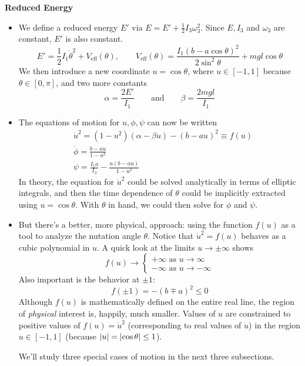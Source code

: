 \documentclass[11pt, a4paper]{article}
\newcommand{\eqtext}[1]{\qquad \text{#1} \qquad}
\newcommand{\veff}{V_{\text{eff}}}
\begin{document}
\textbf{Reduced Energy}
\begin{itemize}
	\item  We define a reduced energy $ E' $ via $ E = E' + \frac{1}{2}I_3 \omega_3^2 $. Since $ E, I_3 $ and $ \omega_3 $ are constant, $ E' $ is also constant.
	\begin{equation*}
		E' = \frac{1}{2}I_1 \dot{\theta}^2 + \veff(\theta), \qquad \veff(\theta) = \frac{I_1(b-a\cos \theta)^2}{2\sin^2 \theta} + mgl\cos \theta
	\end{equation*}
	We then introduce a new coordinate $ u = \cos \theta $, where $ u \in [-1, 1] $ because $ \theta \in [0, \pi] $, and two more constants
	\begin{equation*}
		\alpha = \frac{2 E'}{I_1} \eqtext{and} \beta = \frac{2mgl}{I_1}
	\end{equation*}
	
	\item The equations of motion for $ u, \phi, \psi $ can now be written
	\begin{align*}
		& \dot{u}^2  = (1-u^{2})(\alpha - \beta u) - (b - a u)^2 \equiv f(u)\\
		&\dot{\phi} = \frac{b-au}{1-u^2}\\
		&\dot{\psi} = \frac{I_1a}{I_3} - \frac{u(b-au)}{1-u^2}
	\end{align*}
	In theory, the equation for $ \dot{u}^{2} $ could be solved analytically in terms of elliptic integrals, and then the time dependence of $ \theta $ could be implicitly extracted using $ u = \cos \theta $. With $ \theta $ in hand, we could then solve for $ \phi $ and $ \psi $.
	
	\item But there's a better, more physical, approach: using the function $ f(u) $ as a tool to analyze the nutation angle $ \theta $. Notice that $ \dot{u}^{2} = f(u) $ behaves as a cubic polynomial in $ u $. A quick look at the limits $ u \to \pm \infty $ shows 
	\begin{equation*}
		f(u) \to 
		\begin{cases}
			+ \infty \text{ as } u \to \infty\\
			- \infty \text{ as } u \to -\infty
		\end{cases}
	\end{equation*}
	Also important is the behavior at $ \pm 1 $:
	\begin{equation*}
		f(\pm 1) = - (b \mp a)^{2} \leq 0
	\end{equation*}
	Although $ f(u) $ is mathematically defined on the entire real line, the region of \textit{physical} interest is, happily, much smaller. Values of $ u $ are constrained to positive values of $ f(u) = \dot{u}^2 $ (corresponding to real values of $ \dot{u} $) in the region $ u \in [-1, 1] $ (because $ \abs{u} = \abs{\cos \theta} \leq 1$). 
	
	We'll study three special cases of motion in the next three subsections.
\end{itemize}
\end{document}
